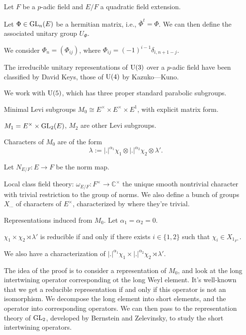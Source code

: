 \documentclass[reqno]{amsart} 
\numberwithin{theorem}{section}
\numberwithin{equation}{section}
\begin{document}
Let $F$ be a $p$-adic field and $E / F$ a quadratic field extension.

Let $\Phi \in \operatorname{GL}_n(E)$ be a hermitian matrix, i.e., $\overline{\Phi}^t = \Phi$.  We can then define the associated unitary group $U_\Phi$.

We consider $\Phi_n =(\Phi_{i j})$, where $\Phi_{i j} =(- 1)^{i - 1} \delta_{i, n + 1 - j}$.

The irreducible unitary representations of $\operatorname{U}(3)$ over a $p$-adic field have been classified by David Keys, those of $\operatorname{U}(4)$ by Kazuko---Kuno.

We work with $\operatorname{U}(5)$, which has three proper standard parabolic subgroups.

Minimal Levi subgroups $M_0 \cong E^\times \times E^\times \times E^1$, with explicit matrix form.

$M_1 = E^\times \times \operatorname{GL}_2(E)$, $M_2$ are other Levi subgroups.

Characters of $M_0$ are of the form
\begin{equation*}
  \lambda := \lvert. \rvert^{\alpha_1} \chi_1 \otimes \lvert . \rvert^{\alpha_2} \chi_2 \otimes \lambda '.
\end{equation*}

Let $N_{E/F} : E \rightarrow F$ be the norm map.

Local class field theory: $\omega_{E / F} : F^\times \rightarrow \mathbb{C}^\times$ the unique smooth nontrivial character with trivial restriction to the group of norms.  We also define a bunch of groups $X_{\dotsb}$ of characters of $E^\times$, characterized by where they're trivial.

Representations induced from $M_0$.  Let $\alpha_1 = \alpha_2 = 0$.
\begin{theorem}
  $\chi_1 \times \chi_2 \rtimes \lambda'$ is reducible if and only if there exists $i \in \{1, 2\}$ such that $\chi_i \in X_{1_{F^\times}}$.
\end{theorem}

We also have a characterization of $\lvert . \rvert^{\alpha_1} \chi_1 \times \lvert . \rvert^{\alpha_2} \chi_2 \rtimes \lambda'$.

The idea of the proof is to consider a representation of $M_0$, and look at the long intertwining operator corresponding ot the long Weyl element.  It's well-known that we get a reducible representation if and only if this operator is not an isomorphism.  We decompose the long element into short elements, and the operator into corresponding operators.  We can then pass to the representation theory of $\operatorname{GL}_2$, developed by Bernstein and Zelevinsky, to study the short intertwining operators.
\end{document}
